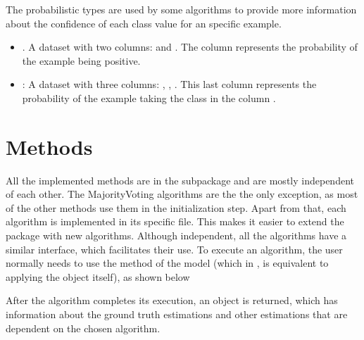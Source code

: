 \documentclass[letterpaper,10pt,english]{sphinxmanual}
\begin{document}
The probabilistic types are used by some algorithms to provide more information about the confidence of each
class value for an specific example.
\begin{itemize}
\item {} 
. A dataset with two columns:  and . The column  
represents the probability of the example being positive.

\item {} 
: A dataset with three columns: , , . This last column 
represents the probability of the example taking the class in the column .

\end{itemize}


\section{Methods}
\label{\detokenize{package/design:methods}}
All the implemented methods are in the  subpackage and are mostly independent of each other. The MajorityVoting algorithms are the the only exception,
as most of the other methods use them in the initialization step. Apart from that, each algorithm 
is implemented in its specific file.  This makes it easier to extend the package with new algorithms. Although independent, all the algorithms have
a similar interface, which facilitates their use. To execute an algorithm, the user normally needs to use the  method of the model (which in , is equivalent to applying the object itself), as shown below

%
\begin{sphinxVerbatim}[commandchars=\\\{\}]
   
\end{sphinxVerbatim}

After the algorithm completes its execution, an object is returned, which has information about the ground truth estimations and
other estimations that are dependent on the chosen algorithm.
\end{document}
